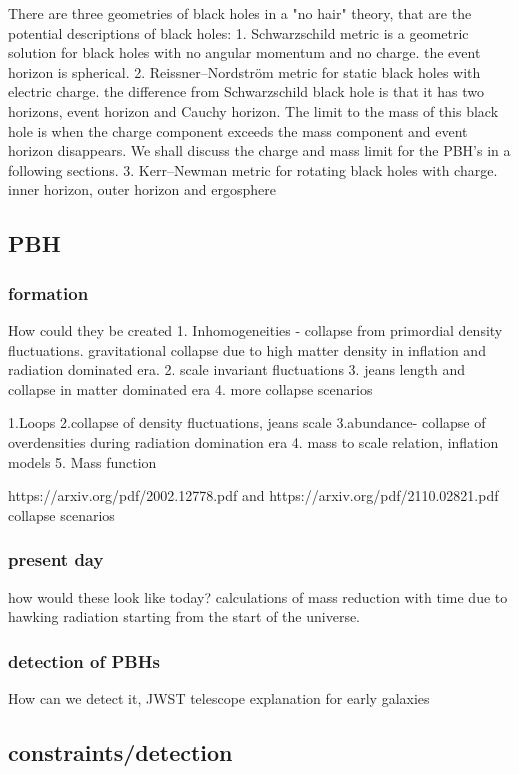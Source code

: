 ﻿\documentclass{article}
\begin{document}
There are three geometries of black holes in a "no hair" theory, that are the potential descriptions of black holes:
1. Schwarzschild metric is a geometric solution for black holes with no angular momentum and no charge. the event horizon is spherical. 
2. Reissner–Nordström metric for static black holes with electric charge. the difference from Schwarzschild black hole is that it has two horizons, event horizon and Cauchy horizon. The limit to the mass of this black hole is when the charge component exceeds the mass component and event horizon disappears. We shall discuss the charge and mass limit for the PBH's in a following sections. 
3. Kerr–Newman metric for rotating black holes with charge. inner horizon, outer horizon and ergosphere 


\subsection {PBH}
\subsubsection {formation} How could they be created
1. Inhomogeneities - collapse from primordial density fluctuations. gravitational collapse due to high matter density in inflation and radiation dominated era.
2. scale invariant fluctuations 
3. jeans length and collapse in matter dominated era 
4. more collapse scenarios 


1.Loops
2.collapse of density fluctuations, jeans scale 
3.abundance- collapse of overdensities during radiation domination era
4. mass to scale relation, inflation models 
5. Mass function 

https://arxiv.org/pdf/2002.12778.pdf and https://arxiv.org/pdf/2110.02821.pdf    collapse scenarios 

\subsubsection {present day} how would these look like today? calculations of mass reduction with time due to hawking radiation starting from the start of the universe. 

\subsubsection {detection of PBHs} How can we detect it, JWST telescope explanation for early galaxies

\subsection {constraints/detection}
\end{document}
